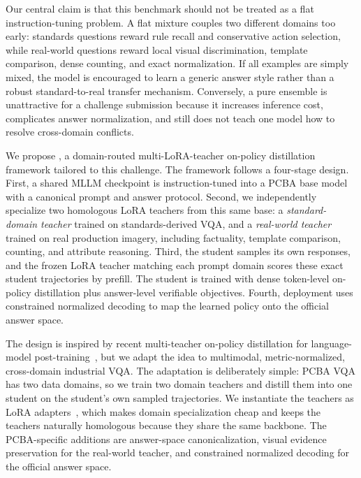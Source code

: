 \documentclass[sigconf, screen, review, anonymous]{acmart}
\begin{document}
Our central claim is that this benchmark should not be treated as a flat instruction-tuning problem. A flat mixture couples two different domains too early: standards questions reward rule recall and conservative action selection, while real-world questions reward local visual discrimination, template comparison, dense counting, and exact normalization. If all examples are simply mixed, the model is encouraged to learn a generic answer style rather than a robust standard-to-real transfer mechanism. Conversely, a pure ensemble is unattractive for a challenge submission because it increases inference cost, complicates answer normalization, and still does not teach one model how to resolve cross-domain conflicts.

We propose \method{}, a domain-routed multi-LoRA-teacher on-policy distillation framework tailored to this challenge. The framework follows a four-stage design. First, a shared MLLM checkpoint is instruction-tuned into a PCBA base model with a canonical prompt and answer protocol. Second, we independently specialize two homologous LoRA teachers from this same base: a \emph{standard-domain teacher} trained on standards-derived VQA, and a \emph{real-world teacher} trained on real production imagery, including factuality, template comparison, counting, and attribute reasoning. Third, the student samples its own responses, and the frozen LoRA teacher matching each prompt domain scores these exact student trajectories by prefill. The student is trained with dense token-level on-policy distillation plus answer-level verifiable objectives. Fourth, deployment uses constrained normalized decoding to map the learned policy onto the official answer space.

The design is inspired by recent multi-teacher on-policy distillation for language-model post-training~\cite{ma2026mopd}, but we adapt the idea to multimodal, metric-normalized, cross-domain industrial VQA. The adaptation is deliberately simple: PCBA VQA has two data domains, so we train two domain teachers and distill them into one student on the student's own sampled trajectories. We instantiate the teachers as LoRA adapters~\cite{hu2021lora}, which makes domain specialization cheap and keeps the teachers naturally homologous because they share the same backbone. The PCBA-specific additions are answer-space canonicalization, visual evidence preservation for the real-world teacher, and constrained normalized decoding for the official answer space.
\end{document}
